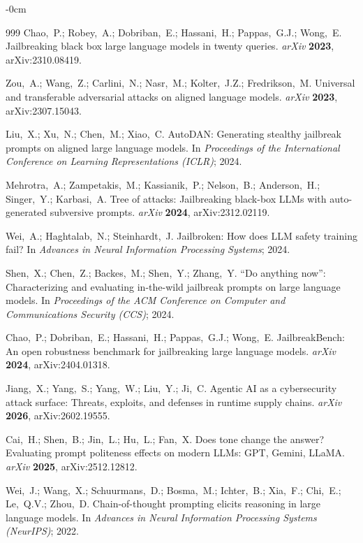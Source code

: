\documentclass[Superintelligence,article,submit,pdftex,moreauthors]{Definitions/mdpi}
\begin{document}
\begin{adjustwidth}{-\extralength}{0cm}
{\begin{thebibliography}{999}
Chao,~P.; Robey,~A.; Dobriban,~E.; Hassani,~H.; Pappas,~G.J.; Wong,~E.
Jailbreaking black box large language models in twenty queries.
{\em arXiv} {\bf 2023}, arXiv:2310.08419.

Zou,~A.; Wang,~Z.; Carlini,~N.; Nasr,~M.; Kolter,~J.Z.; Fredrikson,~M.
Universal and transferable adversarial attacks on aligned language models.
{\em arXiv} {\bf 2023}, arXiv:2307.15043.

Liu,~X.; Xu,~N.; Chen,~M.; Xiao,~C.
{AutoDAN}: Generating stealthy jailbreak prompts on aligned large language models.
In {\em Proceedings of the International Conference on Learning Representations (ICLR)}; 2024.

Mehrotra,~A.; Zampetakis,~M.; Kassianik,~P.; Nelson,~B.; Anderson,~H.; Singer,~Y.; Karbasi,~A.
Tree of attacks: Jailbreaking black-box {LLMs} with auto-generated subversive prompts.
{\em arXiv} {\bf 2024}, arXiv:2312.02119.

Wei,~A.; Haghtalab,~N.; Steinhardt,~J.
Jailbroken: How does {LLM} safety training fail?
In {\em Advances in Neural Information Processing Systems}; 2024.

Shen,~X.; Chen,~Z.; Backes,~M.; Shen,~Y.; Zhang,~Y.
``{D}o anything now'': Characterizing and evaluating in-the-wild jailbreak prompts on large language models.
In {\em Proceedings of the ACM Conference on Computer and Communications Security (CCS)}; 2024.

Chao,~P.; Dobriban,~E.; Hassani,~H.; Pappas,~G.J.; Wong,~E.
{JailbreakBench}: An open robustness benchmark for jailbreaking large language models.
{\em arXiv} {\bf 2024}, arXiv:2404.01318.

Jiang,~X.; Yang,~S.; Yang,~W.; Liu,~Y.; Ji,~C.
Agentic {AI} as a cybersecurity attack surface: Threats, exploits, and defenses in runtime supply chains.
{\em arXiv} {\bf 2026}, arXiv:2602.19555.

Cai,~H.; Shen,~B.; Jin,~L.; Hu,~L.; Fan,~X.
Does tone change the answer? {E}valuating prompt politeness effects on modern {LLMs}: {GPT}, {Gemini}, {LLaMA}.
{\em arXiv} {\bf 2025}, arXiv:2512.12812.

Wei,~J.; Wang,~X.; Schuurmans,~D.; Bosma,~M.; Ichter,~B.; Xia,~F.; Chi,~E.; Le,~Q.V.; Zhou,~D.
Chain-of-thought prompting elicits reasoning in large language models.
In {\em Advances in Neural Information Processing Systems (NeurIPS)}; 2022.


\end{thebibliography}}
\end{adjustwidth}
\end{document}
